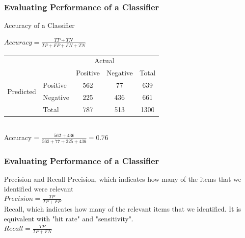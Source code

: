 \documentclass[serif,11pt,aspectratio=1610,table]{beamer}
\begin{document}
\begin{frame}
  \frametitle{Evaluating Performance of a Classifier}
\begin{block}{Accuracy of a Classifier}
\begin{center}
  $Accuracy = \frac{TP + TN}{TP + FP + FN + TN} $
\end{center}
\end{block}
\vspace{.5cm}
\footnotesize
\begin{tabular}{|l|l|c|c|c|}
 \cline{3-5}
 \multicolumn{2}{c|}{}& \multicolumn{2}{c}{Actual}&\\
 \cline{3-5}
 \multicolumn{2}{c|}{}&Positive&Negative&Total\\
 \cline{1-5}
 \multirow{2}{*}{Predicted}& Positive & \cellcolor{orange!25}  562 & 77 & 639\\
 \cline{2-5}
 & Negative & 225 & \cellcolor{orange!25} 436 & 661\\
 \cline{2-5}
 & Total & 787 & 513 & 1300\\
\cline{1-5}
 \end{tabular} \\
\vspace{.5cm}
\footnotesize
Accuracy = $ \frac{562 + 436}{ 562 + 77 + 225 + 436} = 0.76$
\end{frame}

\begin{frame}
 \frametitle{Evaluating Performance of a Classifier}
 \begin{block}{Precision and Recall}
Precision, which indicates how many of the items that we identified were relevant\\
\vspace{.5cm}
  $Precision = \frac{TP}{TP + FP}$ \\
\vspace{.5cm}
Recall, which indicates how many of the relevant items that we identified. It is equivalent with "hit rate" and "sensitivity". \\
\vspace{.5cm}
$Recall = \frac{TP}{TP + FN}$
 \end{block}

\end{frame}
\end{document}
